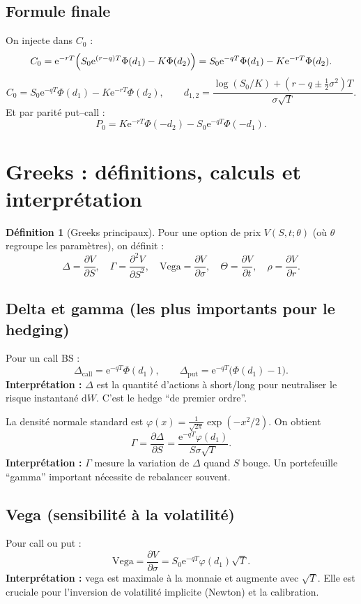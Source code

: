 \documentclass[11pt,a4paper]{report}
\newcommand{\dd}{\mathrm{d}}
\newcommand{\ee}{\mathrm{e}}
\newcommand{\1}{\mathbbm{1}}
\newcommand{\pd}[2]{\frac{\partial #1}{\partial #2}}
\newcommand{\pdd}[2]{\frac{\partial^2 #1}{\partial #2^2}}
\newcommand{\vega}{\mathrm{Vega}}
\theoremstyle{definition}
\newtheorem{definition}{Définition}[chapter]
\theoremstyle{plain}
\theoremstyle{remark}
\begin{document}
\subsection{Formule finale}
On injecte dans $C_0$ :
\[
C_0 = \ee^{-rT}\Bigl(S_0\ee^{(r-q)T}\Phi(d_1) - K\Phi(d_2)\Bigr)
=
S_0\ee^{-qT}\Phi(d_1) - K\ee^{-rT}\Phi(d_2).
\]
\[
\boxed{
C_0 = S_0\ee^{-qT}\Phi(d_1) - K\ee^{-rT}\Phi(d_2),
\qquad
d_{1,2}=\frac{\log(S_0/K)+(r-q\pm \frac12\sigma^2)T}{\sigma\sqrt{T}}.
}
\]
Et par parité put--call :
\[
P_0 = K\ee^{-rT}\Phi(-d_2) - S_0\ee^{-qT}\Phi(-d_1).
\]

\section{Greeks : définitions, calculs et interprétation}
\label{sec:greeks}

\begin{definition}[Greeks principaux]
Pour une option de prix $V(S,t;\theta)$ (où $\theta$ regroupe les paramètres),
on définit :
\[
\Delta=\pd{V}{S},\quad
\Gamma=\pdd{V}{S},\quad
\vega=\pd{V}{\sigma},\quad
\Theta=\pd{V}{t},\quad
\rho=\pd{V}{r}.
\]
\end{definition}

\subsection{Delta et gamma (les plus importants pour le hedging)}
Pour un call BS :
\[
\Delta_{\text{call}} = \ee^{-qT}\Phi(d_1),
\qquad
\Delta_{\text{put}} = \ee^{-qT}\bigl(\Phi(d_1)-1\bigr).
\]
\textbf{Interprétation :} $\Delta$ est la quantité d'actions à short/long pour neutraliser le risque instantané $\dd W$.
C'est le hedge ``de premier ordre''.

La densité normale standard est $\varphi(x)=\frac{1}{\sqrt{2\pi}}\exp(-x^2/2)$.
On obtient
\[
\Gamma = \pd{\Delta}{S} = \frac{\ee^{-qT}\varphi(d_1)}{S\sigma\sqrt{T}}.
\]
\textbf{Interprétation :} $\Gamma$ mesure la variation de $\Delta$ quand $S$ bouge.
Un portefeuille ``gamma'' important nécessite de rebalancer souvent.

\subsection{Vega (sensibilité à la volatilité)}
Pour call ou put :
\[
\vega = \pd{V}{\sigma} = S_0\ee^{-qT}\varphi(d_1)\sqrt{T}.
\]
\textbf{Interprétation :} vega est maximale à la monnaie et augmente avec $\sqrt{T}$.
Elle est cruciale pour l'inversion de volatilité implicite (Newton) et la calibration.
\end{document}
